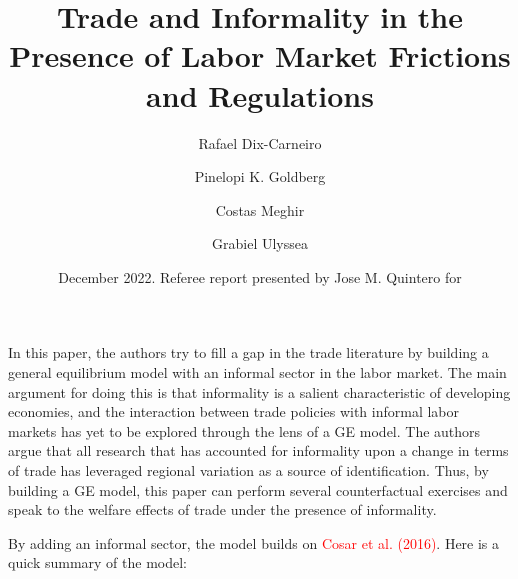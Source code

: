 \documentclass[12pt,oneside,reqno]{amsart}
\title{Trade and Informality in the Presence of Labor Market Frictions and Regulations}
\author{Rafael Dix-Carneiro \and Pinelopi K. Goldberg \and Costas Meghir \and Grabiel Ulyssea}
\date{December 2022. Referee report presented by Jose M. Quintero for}
\begin{document}
\maketitle 

In this paper, the authors try to fill a gap in the trade literature by building a general equilibrium model with an informal sector in the labor market. The main argument for doing this is that informality is a salient characteristic of developing economies, and the interaction between trade policies with informal labor markets has yet to be explored through the lens of a GE model. The authors argue that all research that has accounted for informality upon a change in terms of trade has leveraged regional variation as a source of identification. Thus, by building a GE model, this paper can perform several counterfactual exercises and speak to the welfare effects of trade under the presence of informality. 

By adding an informal sector, the model builds on \textcolor{red}{Cosar et al. (2016)}. Here is a quick summary of the model:
\end{document}
